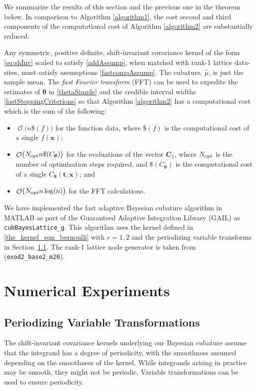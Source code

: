 \documentclass[twocolumn]{svjour3}          %
\DeclareMathOperator{\Order}{{\mathcal O}}
\newcommand{\bm}[1]{\boldsymbol{#1}}
\newcommand{\vtheta}{{\bm{\theta}}}
\newcommand{\vC}{\bm{C}}
\newcommand{\vt}{\bm{t}}
\newcommand{\vx}{\bm{x}}
\newcommand{\opt}{{\textup{opt}}}
\newcommand{\hmu}{\widehat{\mu}}
\newcommand{\code}[1]{\texttt{#1}}
\newcommand\secref{Section~\ref}
\begin{document}
We summarize the results of this section and the previous one in the theorem below.  In comparison to Algorithm \ref{algorithm1}, the cost second and third components of the computational cost of Algorithm  \ref{algorithm2} are substantially reduced.
\begin{theorem}
Any symmetric, positive definite,  shift-\break invariant covariance kernel of the form \eqref{eq:shInv} scaled to satisfy \eqref{addAssump}, when matched with rank-1 lattice data-sites, must satisfy assumptions \eqref{fastcompAssump}.  The cubature, $\hmu$, is just the sample mean.  The \emph{fast Fourier transform} (FFT) can be used to expedite the estimates of $\vtheta$ in \eqref{thetaSimple} and the credible interval widths \eqref{fastStoppingCriterions} so that Algorithm \ref{algorithm2} has a computational cost which is the sum of the following:
\begin{itemize}
	\item $\Order\bigl(n\$(f) \bigr)$ for the function data, where $\$(f)$ is the computational cost of a single $f(\vx)$;
	
	\item $\Order\bigl(N_{\opt} n \$(C_\vtheta) \bigr)$ for the evaluations of the vector $\vC_{1}$, where $N_\opt$ is the number of optimization steps required, and  $\$(C_\vtheta)$ is the computational cost of a single $C_\vtheta(\vt,\vx)$; and
	
	\item $\Order\bigl(N_{\opt} n \log(n) \bigr)$ for the FFT calculations.
	
\end{itemize}

\end{theorem}

We have implemented the fast adaptive Bayesian cubature algorithm in MATLAB as part of the Guaranteed Adaptive Integration Library (GAIL) \cite{ChoEtal17b} as \allowbreak \code{cubBayesLattice\_g}. This algorithm uses the kernel defined in  \eqref{the_kernel_eqn_bernoulli} with  $r=1,2$ and the periodizing variable transforms in  \secref{period_var_tx}.  The rank-1 lattice node generator is taken from \cite{Nuy17a} (\code{exod2\_base2\_m20}).

\section{Numerical Experiments} \label{sec:NumExp}

\subsection{Periodizing Variable Transformations}
\label{period_var_tx}
The shift-invariant covariance kernels underlying our Bayesian cubature  assume that the integrand has a degree of periodicity, with the smoothness assumed depending on the smoothness of the kernel.  While integrands arising in practice may be smooth, they might not be periodic.  Variable transformations can be used to ensure periodicity.
\end{document}
